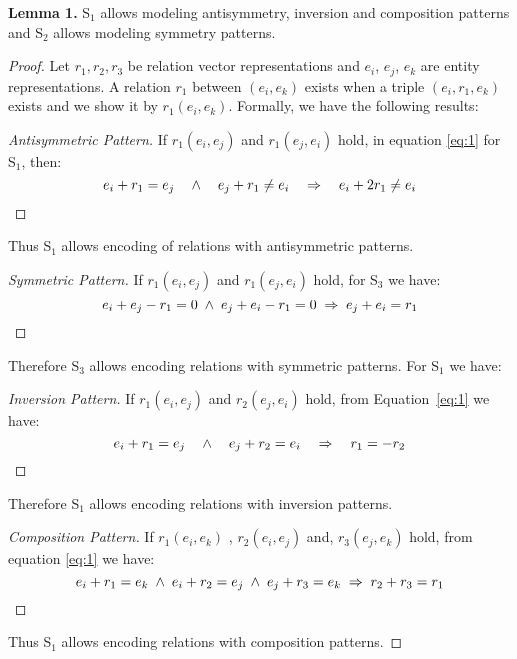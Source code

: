 \documentclass{ecai}
\begin{document}
\textbf{Lemma 1.} S$_1$ allows modeling antisymmetry, inversion and composition patterns and S$_2$ allows modeling symmetry patterns.
\begin{proof}
Let $r_1, r_2, r_3$ be relation vector representations and $e_i$, $e_j$, $e_k$ are entity representations. A relation $r_1$ between $(e_i, e_k)$ exists when a triple $(e_i , r_1 , e_k )$ exists and we show it by $r_1(e_i, e_k )$. Formally, we have the following results:
\begin{proof}[Antisymmetric Pattern]\let\qed\relax
If $r_1(e_i, e_j)$ and $r_1(e_j, e_i)$ hold, in equation \ref{eq:1} for S$_1$, then:
\begin{equation*}
 e_i + r_1 = e_j \quad \wedge \quad e_j + r_1 \not = e_i \quad  \Rightarrow \quad  e_i + 2 r_1 \not = e_i
 \qedhere
\end{equation*}
\end{proof}
\noindent
Thus S$_1$ allows encoding of relations with antisymmetric patterns.
\begin{proof}[Symmetric Pattern]\let\qed\relax
If $r_1(e_i, e_j)$ and $r_1(e_j, e_i)$ hold, for S$_3$ we have:
\begin{equation*}
  e_i +  e_j - r_1 = 0 \; \wedge \;  e_j +  e_i - r_1 = 0 \;  \Rightarrow \; e_j + e_i = r_1 \qedhere
\end{equation*}  
\end{proof}
\noindent
Therefore S$_3$ allows encoding relations with symmetric patterns. For S$_1$ we have:
\begin{proof}[Inversion Pattern]\let\qed\relax
If $r_1(e_i, e_j)$ and $r_2(e_j, e_i)$ hold, from Equation~\ref{eq:1} we have:
\begin{equation*}
e_i + r_1 =  e_j \quad \wedge \quad e_j + r_2 =  e_i \quad \Rightarrow  \quad  r_1 =  - r_2
\qedhere
\end{equation*}
\end{proof}
\noindent
Therefore S$_1$ allows encoding relations with inversion patterns.

\begin{proof}[Composition Pattern]\let\qed\relax
If $r_1(e_i, e_k)$ , $r_2(e_i, e_j)$ and, $r_3(e_j, e_k)$ hold, from equation \ref{eq:1} we have:
\begin{equation*}
e_i + r_1 = e_k \;  \wedge \; e_i + r_2 = e_j \; \wedge \; e_j + r_3 = e_k \;  \Rightarrow \;  r_2 + r_3 = r_1  \qedhere
\end{equation*}
\end{proof}
\noindent
Thus S$_1$ allows encoding relations with composition patterns.
\end{proof} 
\end{document}
